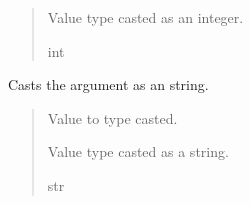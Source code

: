 \documentclass[letterpaper,10pt,english]{sphinxmanual}
\begin{document}
\begin{fulllineitems}
\begin{fulllineitems}
\begin{quote}
\begin{description}
\sphinxAtStartPar
Value type casted as an integer.

\sphinxAtStartPar
int

\end{description}\end{quote}

\end{fulllineitems}


\begin{fulllineitems}
\label{\detokenize{GetUserInput:GetUserInput.UserInput.CastStr}}
\pysigstartsignatures
{}
\pysigstopsignatures
\sphinxAtStartPar
Casts the argument as an string.
\begin{quote}\begin{description}
\sphinxAtStartPar
{} \textendash{} Value to type casted.

\sphinxAtStartPar
Value type casted as a string.

\sphinxAtStartPar
str

\end{description}\end{quote}

\end{fulllineitems}



\end{fulllineitems}
\end{document}
